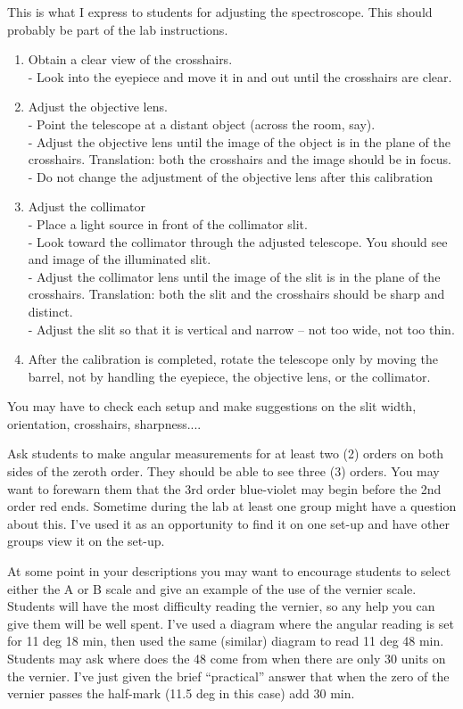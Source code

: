 This is what I express to students for adjusting the spectroscope. This should probably be part of the lab instructions.
\begin{enumerate}
	\item Obtain a clear view of the crosshairs.\\
- Look into  the eyepiece and move it in and out until the crosshairs are clear.

	\item Adjust the objective lens.\\
- Point the telescope at a distant object (across the room, say).\\
- Adjust the objective lens until the image of the object is in the plane of the crosshairs. Translation: both the crosshairs and the image should be in focus.\\
- Do not change the adjustment of the objective lens after this calibration

	\item Adjust the collimator\\
- Place a light source in front of the collimator slit.\\
- Look toward the collimator through the adjusted telescope. You should see and image of the illuminated slit.\\
- Adjust the collimator lens until the image of the slit is in the plane of the crosshairs. Translation: both the slit and the crosshairs should be sharp and distinct.\\
- Adjust the slit so that it is vertical and narrow -- not too wide, not too thin.

	\item After the calibration is completed, rotate the telescope only by moving the barrel, not by handling the eyepiece, the objective lens, or the collimator.
\end{enumerate}
You may have to check each setup and make suggestions on the slit width, orientation, crosshairs, sharpness....

Ask students to make angular measurements for at least two (2) orders on both sides of the zeroth order. They should be able to see three (3) orders. You may want to forewarn them that the 3rd order blue-violet may begin before the 2nd order red ends. Sometime during the lab at least one group might have a question about this. I've used it as an opportunity to find it on one set-up and have other groups view it on the set-up.

At some point in your descriptions you may want to encourage students to select either the A or B scale and give an example of the use of the vernier scale. Students will have the most difficulty reading the vernier, so any help you can give them will be well spent. I've used a diagram where the angular reading is set for 11 deg 18 min, then used the same (similar) diagram to read 11 deg 48 min. Students may ask where does the 48 come from when there are only 30 units on the vernier. I've just given the brief ``practical'' answer that when the zero of the vernier passes the half-mark (11.5 deg in this case) add 30 min.

